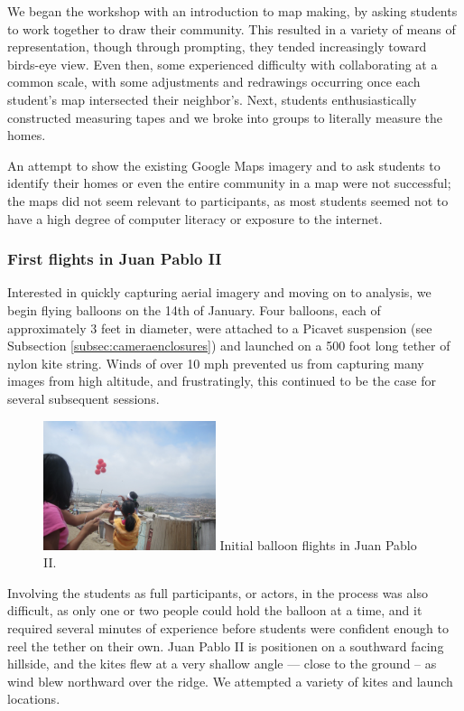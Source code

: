 \documentclass[11pt]{report}
\begin{document}
We began the workshop with an introduction to map making, by asking students to work together to draw their community. This resulted in a variety of means of representation, though through prompting, they tended increasingly toward birds-eye view. Even then, some experienced difficulty with collaborating at a common scale, with some adjustments and redrawings occurring once each student's map intersected their neighbor's. Next, students enthusiastically constructed measuring tapes and we broke into groups to literally measure the homes. 

An attempt to show the existing Google Maps imagery and to ask students to identify their homes or even the entire community in a map were not successful; the maps did not seem relevant to participants, as most students seemed not to have a high degree of computer literacy or exposure to the internet. 

\subsubsection{First flights in Juan Pablo II}

Interested in quickly capturing aerial imagery and moving on to analysis, we begin flying balloons on the 14th of January. Four balloons, each of approximately 3 feet in diameter, were attached to a Picavet suspension (see Subsection \ref{subsec:cameraenclosures}) and launched on a 500 foot long tether of nylon kite string. Winds of over 10 mph prevented us from capturing many images from high altitude, and frustratingly, this continued to be the case for several subsequent sessions. 

\begin{figure}
	\begin{flushright}
		\includegraphics[width=0.45\textwidth]{images/juan-pablo-first-flight.jpg}
		Initial balloon flights in Juan Pablo II.
	\end{flushright}
\end{figure}

Involving the students as full participants, or actors, in the process was also difficult, as only one or two people could hold the balloon at a time, and it required several minutes of experience before students were confident enough to reel the tether on their own. Juan Pablo II is positionen on a southward facing hillside, and the kites flew at a very shallow angle --- close to the ground -- as wind blew northward over the ridge. We attempted a variety of kites and launch locations. 
\end{document}
